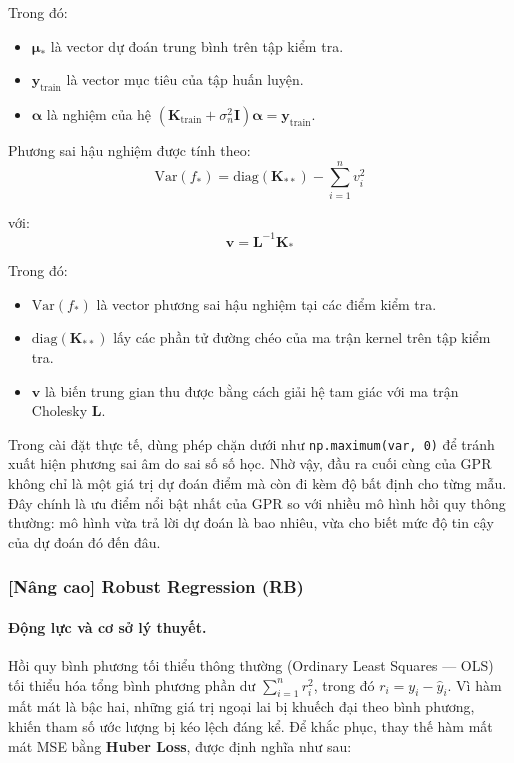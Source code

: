 Trong đó:
\begin{itemize}
    \item $\boldsymbol{\mu}_{*}$ là vector dự đoán trung bình trên tập kiểm tra.
    \item $\mathbf{y}_{\mathrm{train}}$ là vector mục tiêu của tập huấn luyện.
    \item $\boldsymbol{\alpha}$ là nghiệm của hệ $(\mathbf{K}_{\mathrm{train}} + \sigma_n^2\mathbf{I})\boldsymbol{\alpha} = \mathbf{y}_{\mathrm{train}}$.
\end{itemize}

Phương sai hậu nghiệm được tính theo:
\begin{equation}
    \mathrm{Var}(f_*) = \mathrm{diag}(\mathbf{K}_{**}) - \sum_{i=1}^{n} v_i^2
\end{equation}

với:
\begin{equation}
    \mathbf{v} = \mathbf{L}^{-1}\mathbf{K}_{*}
\end{equation}

Trong đó:
\begin{itemize}
    \item $\mathrm{Var}(f_*)$ là vector phương sai hậu nghiệm tại các điểm kiểm tra.
    \item $\mathrm{diag}(\mathbf{K}_{**})$ lấy các phần tử đường chéo của ma trận kernel trên tập kiểm tra.
    \item $\mathbf{v}$ là biến trung gian thu được bằng cách giải hệ tam giác với ma trận Cholesky $\mathbf{L}$.
\end{itemize}

Trong cài đặt thực tế, dùng phép chặn dưới như \texttt{np.maximum(var, 0)} để tránh xuất hiện phương sai âm do sai số số học. Nhờ vậy, đầu ra cuối cùng của GPR không chỉ là một giá trị dự đoán điểm mà còn đi kèm độ bất định cho từng mẫu. Đây chính là ưu điểm nổi bật nhất của GPR so với nhiều mô hình hồi quy thông thường: mô hình vừa trả lời dự đoán là bao nhiêu, vừa cho biết mức độ tin cậy của dự đoán đó đến đâu.


\subsubsection{[Nâng cao] Robust Regression (RB)}

\paragraph{Động lực và cơ sở lý thuyết.}
Hồi quy bình phương tối thiểu thông thường (Ordinary Least Squares — OLS) tối thiểu hóa tổng bình phương phần dư $\sum_{i=1}^{n} r_i^2$, trong đó $r_i = y_i - \hat{y}_i$. Vì hàm mất mát là bậc hai, những giá trị ngoại lai bị khuếch đại theo bình phương, khiến tham số ước lượng bị kéo lệch đáng kể. Để khắc phục, thay thế hàm mất mát MSE bằng \textbf{Huber Loss}, được định nghĩa như sau:

